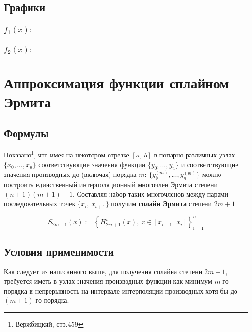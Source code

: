 \documentclass[a4paper, 14pt]{article}
\begin{document}
\clearpage

\subsection{Графики}

\subsubsection{$f_1(x):$}



\clearpage

\subsubsection{$f_2(x):$}



\clearpage

\section{Аппроксимация функции сплайном Эрмита}

\subsection{Формулы}

Показано\footnote{Вержбицкий, стр.459}, что имея на некотором отрезке $[a,~b]$ в попарно различных узлах $\{x_0,...,x_n\}$ соответствующие значения функции $\{y_0,...,y_n\}$ и соответствующие значения производных до (включая) порядка $m$: $\{y^{(m)}_0,...,y^{(m)}_n\}$ можно построить единственный интерполяционный многочлен Эрмита степени $(n+1)(m+1)-1$. Составляя набор таких многочленов между парами последовательных точек $\{x_i,~x_{i+1}\}$ получим \textbf{сплайн Эрмита} степени $2m+1$:

\begin{equation}
    S_{2m+1}(x):=\left\lbrace H^i_{2m+1} (x), ~ x \in [x_{i-1},~ x_i] \right\rbrace^n_{i=1}
\end{equation}

\subsection{Условия применимости}

Как следует из написанного выше, для получения сплайна степени $2m+1$, требуется иметь в узлах значения производных функции как минимум $m$-го порядка и непрерывность на интервале интерполяции производных хотя бы до $(m+1)$-го порядка.
\end{document}
